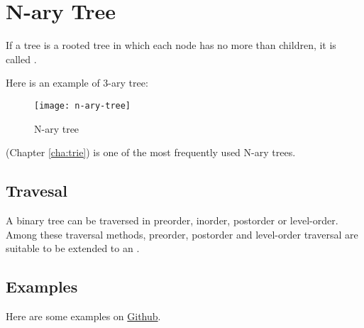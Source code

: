 
\chapter{N-ary Tree}
\label{cha:n-ary-tree}

If a tree is a rooted tree in which each node has no more than  children, it is called .


Here is an example of 3-ary tree:
\begin{figure}[H]
  \centering
  \texttt{[image: n-ary-tree]}
  \caption{N-ary tree}
  \label{fig:n-ary-tree}
\end{figure}

 (Chapter \ref{cha:trie}) is one of the most frequently used N-ary trees.

\section{Travesal}
\label{sec:travesal}


A binary tree can be traversed in preorder, inorder, postorder or level-order.
Among these traversal methods, preorder, postorder and level-order traversal are suitable to be extended to an .


\section{Examples}
\label{sec:examples-5}

Here are some examples on \href{https://github.com/mingmingli916/algorithms/tree/main/n_ary_tree}{Github}.



